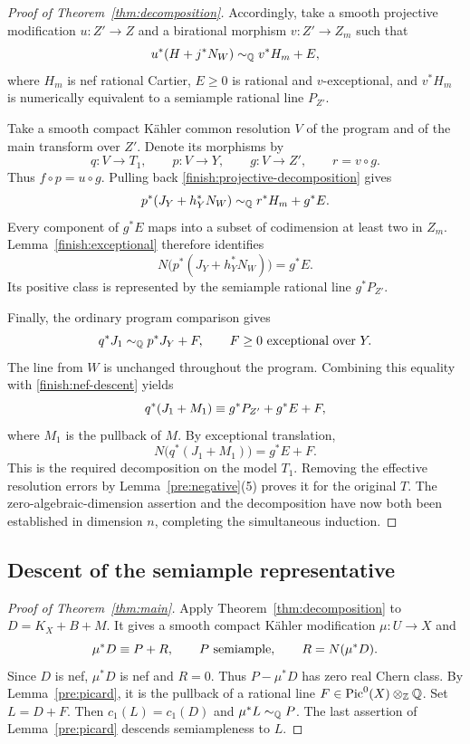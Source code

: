 \begin{proof}[Proof of Theorem~\ref{thm:decomposition}]
Accordingly, take a smooth projective modification \(u:Z'\to Z\)
and a birational morphism \(v:Z'\to Z_m\) such that
\begin{equation}\label{finish:projective-decomposition}
 u^*(H+j^*N_W)\sim_{\mathbb Q} v^*H_m+E,
\end{equation}
where \(H_m\) is nef rational Cartier, \(E\geq0\) is rational and
\(v\)-exceptional, and \(v^*H_m\) is numerically equivalent to a
semiample rational line \(P_{Z'}\).

Take a smooth compact K\"ahler common resolution \(V\) of the program
and of the main transform over \(Z'\). Denote its morphisms by
\[
 q:V\to T_1,\qquad p:V\to Y,\qquad g:V\to Z',
 \qquad r=v\circ g.
\]
Thus \(f\circ p=u\circ g\). Pulling back
\eqref{finish:projective-decomposition} gives
\[
 p^*(J_Y+h_Y^*N_W)\sim_{\mathbb Q} r^*H_m+g^*E.
\]
Every component of \(g^*E\) maps into a subset of codimension at least
two in \(Z_m\). Lemma~\ref{finish:exceptional} therefore identifies
\[
 N\bigl(p^*(J_Y+h_Y^*N_W)\bigr)=g^*E.
\]
Its positive class is represented by the semiample rational line
\(g^*P_{Z'}\).

Finally, the ordinary program comparison gives
\[
 q^*J_1\sim_{\mathbb Q} p^*J_Y+F,\qquad F\geq0
 \text{ exceptional over }Y.
\]
The line from \(W\) is unchanged throughout the program. Combining
this equality with \eqref{finish:nef-descent} yields
\[
 q^*(J_1+M_1)\equiv g^*P_{Z'}+g^*E+F,
\]
where \(M_1\) is the pullback of \(M\). By exceptional translation,
\[
 N\bigl(q^*(J_1+M_1)\bigr)=g^*E+F.
\]
This is the required decomposition on the model \(T_1\).
Removing the effective resolution errors by
Lemma~\ref{pre:negative}(5) proves it for the original \(T\).
The zero-algebraic-dimension assertion and the decomposition have now
both been established in dimension \(n\), completing the simultaneous
induction.
\end{proof}

\subsection{Descent of the semiample representative}

\begin{proof}[Proof of Theorem~\ref{thm:main}]
Apply Theorem~\ref{thm:decomposition} to
\(D=K_X+B+M\). It gives a smooth compact K\"ahler modification
\(\mu:U\to X\) and
\[
 \mu^*D\equiv P+R,\qquad P\text{ semiample},\qquad
 R=N(\mu^*D).
\]
Since \(D\) is nef, \(\mu^*D\) is nef and \(R=0\).
Thus \(P-\mu^*D\) has zero real Chern class. By
Lemma~\ref{pre:picard}, it is the pullback of a rational line
\(F\in\operatorname{Pic}^0(X)\otimes_{\mathbb Z}\mathbb Q\).
Set \(L=D+F\). Then \(c_1(L)=c_1(D)\) and
\(\mu^*L\sim_{\mathbb Q} P\). The last assertion of Lemma~\ref{pre:picard}
descends semiampleness to \(L\).
\end{proof}
